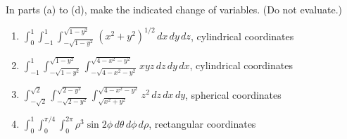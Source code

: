 \documentclass[openany]{book}
\begin{document}
\begin{prob}[4]
    In parts (a) to (d), make the indicated change of variables. (Do not evaluate.)

    \begin{enumerate}
        \item[(a)] \(\displaystyle \int_{0}^{1} \int_{-1}^{1} \int_{-\sqrt{1-y^2}}^{\sqrt{1-y^2}} (x^2 + y^2)^{1/2} \, dx \, dy \, dz\), cylindrical coordinates
        \item[(b)] \(\displaystyle \int_{-1}^{1} \int_{-\sqrt{1-y^2}}^{\sqrt{1-y^2}} \int_{-\sqrt{4-x^2-y^2}}^{\sqrt{4-x^2-y^2}} xyz \, dz \, dy \, dx\), cylindrical coordinates
        \item[(c)] \(\displaystyle \int_{-\sqrt{2}}^{\sqrt{2}} \int_{-\sqrt{2-y^2}}^{\sqrt{2-y^2}} \int_{\sqrt{x^2+y^2}}^{\sqrt{4-x^2-y^2}} z^2 \, dz \, dx \, dy\), spherical coordinates
        \item[(d)] \(\displaystyle \int_{0}^{1} \int_{0}^{\pi/4} \int_{0}^{2\pi} \rho^3 \sin 2\phi \, d\theta \, d\phi \, d\rho\), rectangular coordinates
    \end{enumerate}
\end{prob}
\end{document}
